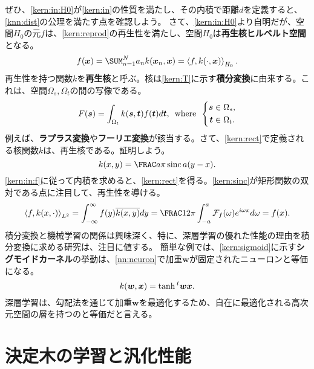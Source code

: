 \documentclass[10pt,a4paper]{book}
\begin{document}
%
ぜひ、\eqref{kern:in:H0}が\eqref{kern:in}の性質を満たし、その内積で距離$d$を定義すると、\eqref{knn:dist}の公理を満たす点を確認しよう。
さて、\eqref{kern:in:H0}より自明だが、空間$H_0$の元$f$は、\eqref{kern:reprod}の再生性を満たし、空間$H_0$は\textbf{再生核ヒルベルト空間}となる。
%
\begin{equation}
\label{eq:kern:reprod}
f(\bm{x}) = \sum_{n=1}^N a_n k(\bm{x}_n,\bm{x}) = \iprod{f}{k(\cdot,\bm{x})}_{H_0}.
\end{equation}
%
再生性を持つ関数$k$を\textbf{再生核}と呼ぶ。核は\eqref{kern:T}に示す\textbf{積分変換}に由来する。これは、空間$\Omega_s,\Omega_t$の間の写像である。
%
\begin{equation}
\label{eq:kern:T}
F(\bm{s}) = \int_{\Omega_t} k(\bm{s}, \bm{t}) f(\bm{t}) d\bm{t},
\enspace\mathrm{where}\enspace
\left\{
\begin{aligned}
\bm{s} &\in \Omega_s,\\
\bm{t} &\in \Omega_t.
\end{aligned}
\right.
\end{equation}
%
例えば、\textbf{ラプラス変換}や\textbf{フーリエ変換}が該当する。さて、\eqref{kern:rect}で定義される核関数$k$は、再生核である。証明しよう。
%
\begin{equation}
\label{eq:kern:sinc}
k(x,y) = \frac{a}{\pi} \sinc a(y-x).
\end{equation}
%
\eqref{kern:in:f}に従って内積を求めると、\eqref{kern:rect}を得る。\eqref{kern:sinc}が矩形関数の双対である点に注目して、再生性を導ける。
%
\begin{equation}
\label{eq:kern:rect}
\iprod{f}{k(x,\cdot)}_{L^2} =
\int_{-\infty}^\infty f(y) \overline{k(x,y)} dy =
\frac{1}{2\pi} \int_{-a}^a \mathcal{F}_f(\omega) e^{i \omega x} d\omega =
f(x).
\end{equation}
%
積分変換と機械学習の関係は興味深く、特に、深層学習の優れた性能の理由を積分変換に求める研究は、注目に値する。
簡単な例では、\eqref{kern:sigmoid}に示す\textbf{シグモイドカーネル}の挙動は、\eqref{nn:neuron}で加重$\bm{w}$が固定されたニューロンと等価になる。
%
\begin{equation}
\label{eq:kern:sigmoid}
k(\bm{w},\bm{x}) = \tanh {}^t\bm{w} \bm{x}.
\end{equation}
%
深層学習は、勾配法を通じて加重$\bm{w}$を最適化するため、自在に最適化される高次元空間の層を持つのと等価だと言える。

\chapter{決定木の学習と汎化性能\label{chap:dt}}
\end{document}
